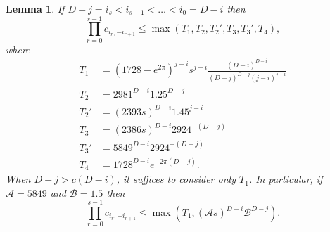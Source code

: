 \documentclass[12pt]{amsart}
\theoremstyle{plain} %
\newtheorem{lemma}      [theorem]{Lemma}
\theoremstyle{definition}
\theoremstyle{remark}
\numberwithin{equation}{section}
\begin{document}
\begin{lemma}\label{l:BP}
If $D-j=i_s<i_{s-1}<\ldots<i_0=D-i$ then
\[\prod_{r=0}^{s-1}c_{i_r,-i_{r+1}}\leq \max(T_1,T_2,T_2',T_3,T_3',T_4),\]
where
\begin{align*}
  T_1&=(1728-e^{2\pi})^{j-i}s^{j-i}\frac{(D-i)^{D-i}}{(D-j)^{D-j}(j-i)^{j-i}}\\
  T_2&=2981^{D-i}1.25^{D-j}\\
  T_2'&=(2393s)^{D-i}1.45^{j-i}\\
  T_3&=(2386s)^{D-i}2924^{-(D-j)}\\
  T_3'&=5849^{D-i}2924^{-(D-j)}\\
  T_4&=1728^{D-i}e^{-2\pi (D-j)}.
\end{align*}
When $D-j>c(D-i)$, it suffices to consider only $T_1$. In
particular, if $\mathcal{A}=5849$ and $\mathcal{B} = 1.5$ then
\[\prod_{r=0}^{s-1}c_{i_r,-i_{r+1}}\leq \max(T_1,(\mathcal{A}s)^{D-i}\mathcal{B}^{D-j}).\]
\end{lemma}
\end{document}
